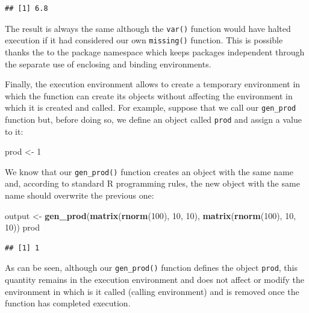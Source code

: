 \documentclass[12pt,]{krantz}
\newenvironment{Shaded}{\begin{snugshade}}{\end{snugshade}}
\newcommand{\KeywordTok}[1]{\textcolor[rgb]{0.27,0.27,0.27}{\textbf{#1}}}
\newcommand{\DecValTok}[1]{\textcolor[rgb]{0.06,0.06,0.06}{#1}}
\newcommand{\StringTok}[1]{\textcolor[rgb]{0.5,0.5,0.5}{#1}}
\newcommand{\NormalTok}[1]{#1}
\begin{document}
\begin{verbatim}
## [1] 6.8
\end{verbatim}

The result is always the same although the \texttt{var()} function would
have halted execution if it had considered our own \texttt{missing()}
function. This is possible thanks the to the package namespace which
keeps packages independent through the separate use of enclosing and
binding environments.

Finally, the execution environment allows to create a temporary
environment in which the function can create its objects without
affecting the environment in which it is created and called. For
example, suppose that we call our \texttt{gen\_prod} function but,
before doing so, we define an object called \texttt{prod} and assign a
value to it:

\begin{Shaded}
\begin{Highlighting}[]
\NormalTok{prod <-}\StringTok{ }\DecValTok{1}
\end{Highlighting}
\end{Shaded}

We know that our \texttt{gen\_prod()} function creates an object with
the same name and, according to standard R programming rules, the new
object with the same name should overwrite the previous one:

\begin{Shaded}
\begin{Highlighting}[]
\NormalTok{output <-}\StringTok{ }\KeywordTok{gen_prod}\NormalTok{(}\KeywordTok{matrix}\NormalTok{(}\KeywordTok{rnorm}\NormalTok{(}\DecValTok{100}\NormalTok{), }\DecValTok{10}\NormalTok{, }\DecValTok{10}\NormalTok{), }\KeywordTok{matrix}\NormalTok{(}\KeywordTok{rnorm}\NormalTok{(}\DecValTok{100}\NormalTok{), }\DecValTok{10}\NormalTok{, }\DecValTok{10}\NormalTok{))}
\NormalTok{prod}
\end{Highlighting}
\end{Shaded}

\begin{verbatim}
## [1] 1
\end{verbatim}

As can be seen, although our \texttt{gen\_prod()} function defines the
object \texttt{prod}, this quantity remains in the execution environment
and does not affect or modify the environment in which is it called
(calling environment) and is removed once the function has completed
execution.
\end{document}
